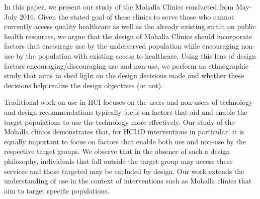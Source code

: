 In this paper, we present our study of the Mohalla Clinics conducted from May-July 2016. Given the stated goal of these clinics to serve those who cannot currently access quality healthcare as well as the already existing strain on public health resources, we argue that the design of Mohalla Clinics should incorporate factors that encourage use by the underserved population while encouraging non-use by the population with existing access to healthcare. Using this lens of design factors encouraging/discouraging use and non-use, we perform an ethnographic study that aims to shed light on the design decisions made and whether these decisions help realize the design objectives (or not). 

Traditional work on use in HCI focuses on the users and non-users of technology and design recommendations typically focus on factors that aid and enable the target populations to use the technology more effectively. Our study of the Mohalla clinics demonstrates that, for HCI4D interventions in particular, it is equally important to focus on factors that enable both use and non-use by the respective target groups.  We observe that in the absence of such a design philosophy, individuals that fall outside the target group may access these services and those targeted may be excluded by design. Our work extends the understanding of use in the context of interventions such as Mohalla clinics that aim to target specific populations.

\begin{comment}
In this paper, we present our study of the Mohalla Clinics conducted from May-July 2016. Our use of ethnographic methods aims to shed light on the design objectives of this initiative and how these were realized (or not). By discussing the findings from our observations and interviews, we draw attention to the target users of this initiative and the use that resulted from this intervention, highlighting the challenges of (designing such programs).

While traditional work on use in HCI focuses on the users and non-users of technology and design recommendations follow initial assumptions regarding these groups \cite{?}, our study of the Mohalla clinics demonstrates that the distinction between use and non-use can be unclear. Individuals that fall outside the target group may access these services \cite{baumer2015usees} and those targeted may be excluded by design. Our paper draws upon the existing body of literature to extend the understanding of use in the context of interventions such as Mohalla clinics that aim to target specific populations.
\end{comment}